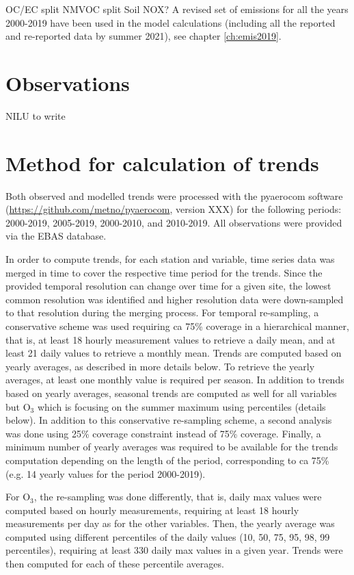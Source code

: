  OC/EC split
 NMVOC split
 Soil NOX?
A revised set of emissions for all the years 2000-2019 have been used in the model calculations (including all the reported and re-reported data by summer 2021), see chapter \ref{ch:emis2019}.

\section{\label{OBSTrends}{Observations}} NILU to write

\section{\label{Method}{Method for calculation of trends}}
Both observed and modelled trends were processed with the pyaerocom software (\url{https://github.com/metno/pyaerocom}, version XXX) for the following periods: 2000-2019, 2005-2019, 2000-2010, and 2010-2019. All observations were provided via the EBAS database. 

In order to compute trends, for each station and variable, time series data was merged in time to cover the respective time period for the trends.
Since the provided temporal resolution can change over time for a given site, the lowest common resolution was identified and higher resolution data were down-sampled to that resolution during the merging process. For temporal re-sampling, a conservative scheme was used requiring ca 75\% coverage in a hierarchical manner, that is, at least 18 hourly measurement values to retrieve a daily mean, and at least 21 daily values to retrieve a monthly mean. Trends are computed based on yearly averages, as described in more details below. To retrieve the yearly averages, at least one monthly value is required per season. In addition to trends based on yearly averages, seasonal trends are computed as well for all variables but O$_{3}$ which is focusing on the summer maximum using percentiles (details below). In addition to this conservative re-sampling scheme, a second analysis was done using 25\% coverage constraint instead of 75\% coverage. Finally, a minimum number of yearly averages was required to be available for the trends computation depending on the length of the period, corresponding to ca 75\% (e.g. 14 yearly values for the period 2000-2019).

For O$_3$, the re-sampling was done differently, that is, daily max values were computed based on hourly measurements, requiring at least 18 hourly measurements per day as for the other variables. Then, the yearly average was computed using different percentiles of the daily values (10, 50, 75, 95, 98, 99 percentiles), requiring at least 330 daily max values in a given year. Trends were then computed for each of these percentile averages.

